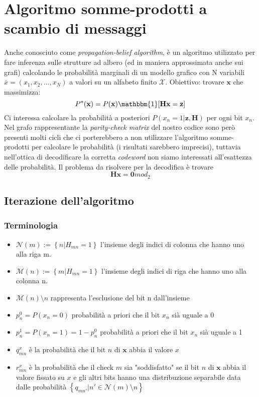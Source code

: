 \documentclass{article}
\begin{document}
	\section{Algoritmo somme-prodotti a scambio di messaggi}
Anche conosciuto come \textit{propagation-belief algorithm}, è un algoritmo utilizzato per fare inferenza sulle strutture ad albero (ed in maniera approssimata anche sui grafi) calcolando le probabilità marginali di un modello grafico con N variabili $\bar{x} = (x_1,x_2, ..., x_N)$ a valori su un alfabeto finito $\mathcal{X}$.
Obiettivo: trovare $\textbf{x}$ che massimizza:
\begin{equation} 
	P^*(\textbf{x})=P(\textbf{x})\mathbbm{1}[\textbf{Hx} = \textbf{z}]
\end{equation}
Ci interessa calcolare la probabilità a posteriori $P(x_n = 1 | \textbf{z}, \textbf{H})$ per ogni bit $x_n$. Nel grafo rappresentante la \textit{parity-check matrix} del nostro codice sono però presenti molti cicli che ci porterebbero a non utilizzare l'algoritmo somme-prodotti per calcolare le probabilità (i risultati sarebbero imprecisi), tuttavia nell'ottica di decodificare la corretta \textit{codeword} non siamo interessati all'esattezza delle probabilità. Il problema da risolvere per la decodifica è trovare 
\begin{equation}
\textbf{Hx} = \textbf{0}  mod_2
\end{equation}
	\subsection{Iterazione dell'algoritmo}
	\subsubsection{Terminologia}
	\begin{itemize}
		\item $\mathcal{N}(m) := \left\{ n | H_{mn} = 1 \right\}$ l'insieme degli indici di colonna che hanno uno alla riga m.
		\item $\mathcal{M}(n) := \left\{ m | H_{mn} = 1 \right\}$ l'insieme degli indici di riga che hanno uno alla colonna n.
		\item $\mathcal{M}(n)\setminus n$ rappresenta l'esclusione del bit n dall'insieme
		\item $p_n^0 = P(x_n=0)$ probabilità a priori che il bit $x_n$ sià uguale a 0
		\item $p_n^1 = P(x_n=1)=1-p_n^0$ probabilità a priori che il bit $x_n$ sià uguale a 1
		\item $q^x_{mn}$ è la probabilità che il bit $n$ di $\textbf{x}$ abbia il valore $x$
		\item $r^x_{mn}$ è la probabilità che il check $m$ sia "soddisfatto" se il bit $n$ di $\textbf{x}$ abbia il valore fissato su $x$ e gli altri bits hanno una distribuzione separabile data dalle probabilità $\left\{ q_{mn'} | n' \in \mathcal{N}(m)\setminus n\right\}$
	\end{itemize}
\end{document}
